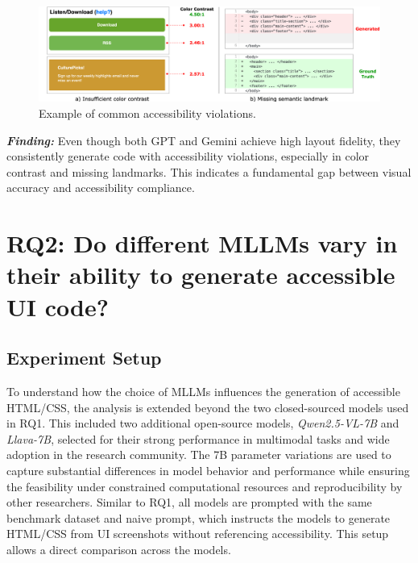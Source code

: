 \begin{figure}[htbp]
  \centering
  \includegraphics[width=0.9\linewidth]{figures/colorcontrastlandmarkexample.png}
  \caption{Example of common accessibility violations.}
  \label{fig:common} 
\end{figure}


\begin{center}
\begin{tcolorbox}[colback=black!5!white,colframe=black!75!black,bottom=-0.05pt,top=-0.05pt]
\textit{\textbf{Finding:}} Even though both GPT and Gemini achieve high layout fidelity, 
they consistently generate code with accessibility violations, 
especially in color contrast and missing landmarks. This indicates 
a fundamental gap between visual accuracy and accessibility compliance.
\end{tcolorbox}
\end{center}


\begingroup
    
\endgroup



\section{RQ2: Do different MLLMs vary in their ability to generate accessible UI code?}
\subsection{Experiment Setup}
To understand how the choice of MLLMs influences the generation of 
accessible HTML/CSS, the analysis is extended beyond the two 
closed-sourced models used in RQ1. This included two additional 
open-source models, \textit{Qwen2.5-VL-7B} and \textit{Llava-7B}, 
selected for their strong performance in multimodal tasks and 
wide adoption in the research community. 
The 7B parameter variations are used to capture substantial 
differences in model behavior and performance while ensuring 
the feasibility under constrained computational resources and 
reproducibility by other researchers.
Similar to RQ1, all models are prompted with the same 
benchmark dataset and naive prompt,
which instructs the models to generate HTML/CSS from UI screenshots
without referencing accessibility. This setup allows a 
direct comparison across the models.

